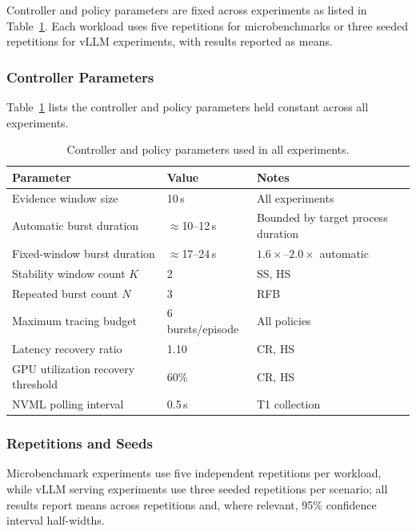 Controller and policy parameters are fixed across experiments as listed in Table~\ref{tab:setup-params}. Each workload uses five repetitions for microbenchmarks or three seeded repetitions for vLLM experiments, with results reported as means.

\subsubsection{Controller Parameters}

Table~\ref{tab:setup-params} lists the controller and policy parameters held constant across all experiments.

\begin{table}[h]
\centering
\caption{Controller and policy parameters used in all experiments.}
\label{tab:setup-params}
\footnotesize
\setlength{\tabcolsep}{4pt}
\begin{tabularx}{\columnwidth}{@{}l l >{\raggedright\arraybackslash}X@{}}
\toprule
\textbf{Parameter} & \textbf{Value} & \textbf{Notes} \\
\midrule
Evidence window size               & 10\,s              & All experiments \\
Automatic burst duration           & $\approx$10--12\,s & Bounded by target process duration \\
Fixed-window burst duration        & $\approx$17--24\,s & $1.6\times$--$2.0\times$ automatic \\
Stability window count $K$         & 2                  & \textsc{SS}, \textsc{HS} \\
Repeated burst count $N$           & 3                  & \textsc{RFB} \\
Maximum tracing budget             & 6 bursts/episode   & All policies \\
Latency recovery ratio             & 1.10               & \textsc{CR}, \textsc{HS} \\
GPU utilization recovery threshold & 60\%               & \textsc{CR}, \textsc{HS} \\
NVML polling interval              & 0.5\,s             & T1 collection \\
\bottomrule
\end{tabularx}
\end{table}


\subsubsection{Repetitions and Seeds}

Microbenchmark experiments use five independent repetitions per workload, while vLLM serving experiments use three seeded repetitions per scenario; all results report means across repetitions and, where relevant, 95\% confidence interval half-widths.










